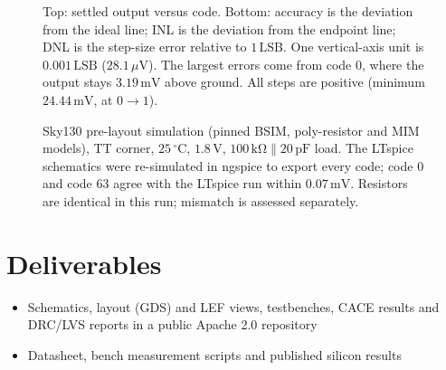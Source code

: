 \documentclass[10pt,a4paper]{article}
\begin{document}
\begin{figure}[H]
\vspace{1mm}
{\small Top: settled output versus code. Bottom: accuracy is the deviation from the ideal line; INL is the deviation from the endpoint line; DNL is the step-size error relative to $1\,\mathrm{LSB}$. One vertical-axis unit is $0.001\,\mathrm{LSB}$ ($28.1\,\mu\mathrm{V}$). The largest errors come from code 0, where the output stays $3.19\,\mathrm{mV}$ above ground. All steps are positive (minimum $24.44\,\mathrm{mV}$, at $0 \to 1$).}
\captionsetup{skip=3pt}\caption*{\footnotesize Sky130 pre-layout simulation (pinned BSIM, poly-resistor and MIM models), TT corner, $25\,^\circ$C, $1.8\,\mathrm{V}$, $100\,\mathrm{k\Omega} \parallel 20\,\mathrm{pF}$ load. The LTspice schematics were re-simulated in ngspice to export every code; code 0 and code 63 agree with the LTspice run within $0.07\,\mathrm{mV}$. Resistors are identical in this run; mismatch is assessed separately.}
\end{figure}

\section{Deliverables}
\begin{itemize}
    \item Schematics, layout (GDS) and LEF views, testbenches, CACE results and DRC/LVS reports in a public Apache 2.0 repository
    \item Datasheet, bench measurement scripts and published silicon results
\end{itemize}

\end{document}
